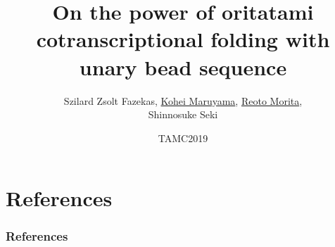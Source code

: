 \documentclass[11pt]{beamer}
\title{On the power of oritatami cotranscriptional folding with unary bead sequence}
\date{TAMC2019}
\author{Szilard Zsolt Fazekas, \underline{Kohei Maruyama}, \underline{Reoto Morita}, \\Shinnosuke Seki}
\institute{Akita university, University of Electro-Communications}
\begin{document}
\begin{frame}\frametitle{}
 \titlepage
\end{frame}

\begin{frame}\frametitle{}
 \tableofcontents
\end{frame}








\section{References}
\begin{frame}[t, allowframebreaks]\frametitle{References}

\end{frame}
\end{document}
